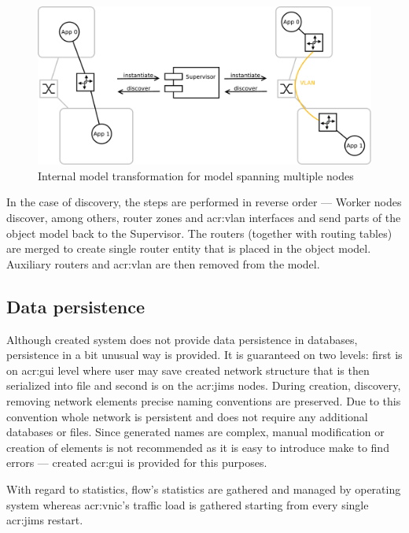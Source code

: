 \documentclass[11pt,openany]{book}
\begin{document}
          \begin{figure}[h]
            \centering
            \includegraphics[width=.9\textwidth]{img/test-case/router.pdf}

            \caption{Internal model transformation for model spanning multiple nodes}
            \label{fig:impl:router}
          \end{figure}

          In the case of discovery, the steps are performed in reverse order --- Worker nodes discover, among others,
          router zones and \gls{acr:vlan} interfaces and send parts of the object model back to the Supervisor. The
          routers (together with routing tables) are merged to create single router entity that is placed in the object
          model. Auxiliary routers and \gls{acr:vlan} are then removed from the model.
			
		
      \subsection{Data persistence}
      \label{sec:impl:persist}

        Although created system does not provide data persistence in databases, persistence in a bit unusual way  is
        provided. It is guaranteed on two levels: first is on \gls{acr:gui} level where user may save created
        network structure that is then serialized into file and second is on the \gls{acr:jims} nodes. During
        creation, discovery, removing network elements precise naming conventions are preserved. Due to this convention
        whole network is persistent and does not require any additional databases or files. Since generated names are
        complex, manual modification or creation of elements is not recommended as it is easy to introduce make to find
        errors --- created \gls{acr:gui} is provided for this purposes.

        With regard to statistics, flow's statistics are gathered and managed by operating system whereas \gls{acr:vnic}'s
        traffic load is gathered starting from every single \gls{acr:jims} restart.
\end{document}
